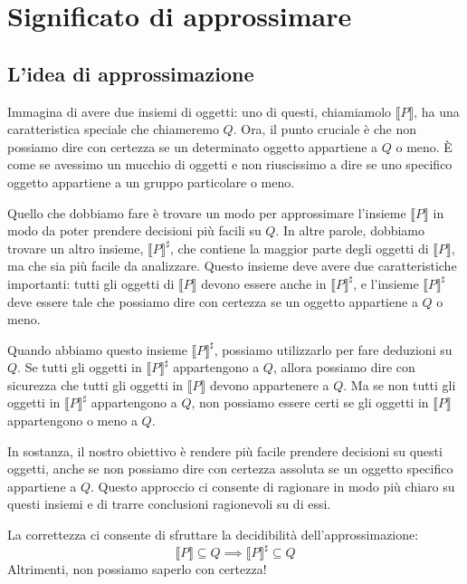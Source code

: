 \chapter{Significato di approssimare}
\section{L'idea di approssimazione}
Immagina di avere due insiemi di oggetti: uno di questi, chiamiamolo $\llbracket P \rrbracket$,
ha una caratteristica speciale che chiameremo $Q$. Ora, il punto cruciale è che non possiamo dire
con certezza se un determinato oggetto appartiene a $Q$ o meno. È come se avessimo un mucchio di
oggetti e non riuscissimo a dire se uno specifico oggetto appartiene a un gruppo particolare o meno.

Quello che dobbiamo fare è trovare un modo per approssimare l'insieme $\llbracket P \rrbracket$
in modo da poter prendere decisioni più facili su $Q$. In altre parole, dobbiamo trovare un altro
insieme, $\llbracket P \rrbracket^\sharp$, che contiene la maggior parte degli oggetti di $\llbracket P \rrbracket$,
ma che sia più facile da analizzare. Questo insieme deve avere due caratteristiche importanti: tutti gli
oggetti di $\llbracket P \rrbracket$ devono essere anche in $\llbracket P \rrbracket^\sharp$, e l'insieme
$\llbracket P \rrbracket^\sharp$ deve essere tale che possiamo dire con certezza se un oggetto appartiene a $Q$ o meno.

Quando abbiamo questo insieme $\llbracket P \rrbracket^\sharp$, possiamo utilizzarlo per fare deduzioni
su $Q$. Se tutti gli oggetti in $\llbracket P \rrbracket^\sharp$ appartengono a $Q$, allora possiamo dire
con sicurezza che tutti gli oggetti in $\llbracket P \rrbracket$ devono appartenere a $Q$. Ma se non
tutti gli oggetti in $\llbracket P \rrbracket^\sharp$ appartengono a $Q$, non possiamo essere certi se gli
oggetti in $\llbracket P \rrbracket$ appartengono o meno a $Q$.

In sostanza, il nostro obiettivo è rendere più facile prendere decisioni su questi oggetti, anche se non
possiamo dire con certezza assoluta se un oggetto specifico appartiene a $Q$. Questo approccio ci consente
di ragionare in modo più chiaro su questi insiemi e di trarre conclusioni ragionevoli su di essi.

La correttezza ci consente di sfruttare la decidibilità dell'approssimazione:
\[
  \llbracket P \rrbracket \subseteq Q \implies \llbracket P \rrbracket^\sharp \subseteq Q  
\]
Altrimenti, non possiamo saperlo con certezza!
